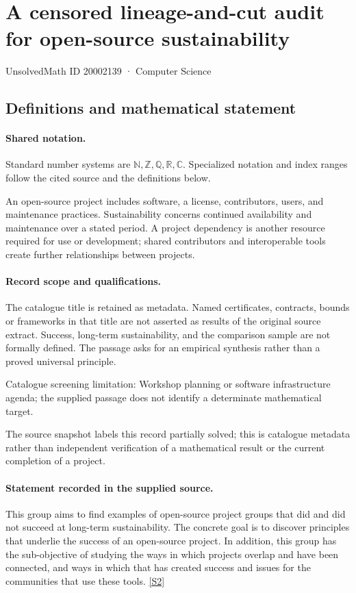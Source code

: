 \documentclass[11pt]{article}
\newcommand{\sref}[2]{\hyperlink{source:#1:#2}{[S#2]}}
\begin{document}
\setcounter{section}{20002138}
\section{A censored lineage-and-cut audit for open-source sustainability}\label{20002139}
{\small\sffamily UnsolvedMath ID 20002139 · Computer Science}
\subsection{Definitions and mathematical statement}

\paragraph{Shared notation.}Standard number systems are $\mathbb N,\mathbb Z,\mathbb Q,\mathbb R,\mathbb C$. Specialized notation and index ranges follow the cited source and the definitions below.


An open-source project includes software, a license, contributors, users, and maintenance practices. Sustainability concerns continued availability and maintenance over a stated period. A project dependency is another resource required for use or development; shared contributors and interoperable tools create further relationships between projects.
\paragraph{Record scope and qualifications.}
The catalogue title is retained as metadata. Named certificates, contracts, bounds or frameworks in that title are not asserted as results of the original source extract.
Success, long-term sustainability, and the comparison sample are not formally defined. The passage asks for an empirical synthesis rather than a proved universal principle.

Catalogue screening limitation: Workshop planning or software infrastructure agenda; the supplied passage does not identify a determinate mathematical target.

The source snapshot labels this record partially solved; this is catalogue metadata rather than independent verification of a mathematical result or the current completion of a project.
\paragraph{Statement recorded in the supplied source.}
This group aims to find examples of open-source project groups that did and did not succeed at long-term sustainability. The concrete goal is to discover principles that underlie the success of an open-source project. In addition, this group has the sub-objective of studying the ways in which projects overlap and have been connected, and ways in which that has created success and issues for the communities that use these tools. \sref{20002139}{2}
\end{document}
